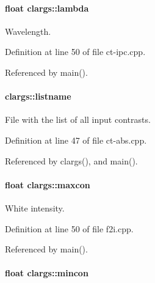 \hypertarget{structclargs_a65b54d07666689a60f098e56ef3d69f1}{
\paragraph[{lambda}]{\setlength{\rightskip}{0pt plus 5cm}float {\bf clargs::lambda}}\hfill}
\label{structclargs_a65b54d07666689a60f098e56ef3d69f1}


Wavelength. 



Definition at line 50 of file ct-\/ipc.cpp.



Referenced by main().

\hypertarget{structclargs_a3adde5b0d161b47d7965175538422823}{
\paragraph[{listname}]{ {\bf clargs::listname}}\hfill}
\label{structclargs_a3adde5b0d161b47d7965175538422823}


File with the list of all input contrasts. 



Definition at line 47 of file ct-\/abs.cpp.



Referenced by clargs(), and main().

\hypertarget{structclargs_ae2abd48864e4ba3558d55ea7be88c692}{
\paragraph[{maxcon}]{\setlength{\rightskip}{0pt plus 5cm}float {\bf clargs::maxcon}}\hfill}
\label{structclargs_ae2abd48864e4ba3558d55ea7be88c692}


White intensity. 



Definition at line 50 of file f2i.cpp.



Referenced by main().

\hypertarget{structclargs_acb43c41b73b9cfed1133cb13a32f4573}{
\paragraph[{mincon}]{\setlength{\rightskip}{0pt plus 5cm}float {\bf clargs::mincon}}\hfill}
\label{structclargs_acb43c41b73b9cfed1133cb13a32f4573}


